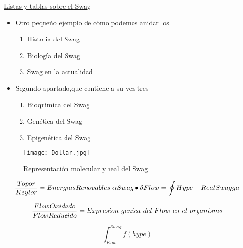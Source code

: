 \documentclass{article}
\begin{document}
\centerline{\Large\underline{Listas y tablas sobre el Swag}}

\bigskip

\renewcommand{\labelitemi}{\Large\color{red}\textbullet}
\addtolength{\leftmarginii}{3cm}
\begin{itemize}
 \item Otro pequeño ejemplo de cómo podemos anidar los 
 \begin{enumerate}
  \item Historia del Swag
  \item Biología del Swag
  \item Swag en la actualidad
 \end{enumerate}
 \item Segundo apartado,que contiene a su vez tres 
 \begin{enumerate}
  \item Bioquímica del Swag
  \item Genética del Swag
  \item Epigenética del Swag
 \end{enumerate}
\end{itemize}


\begin{figure}[h]
\texttt{[image: Dollar.jpg]}
\caption{Representación molecular y real del Swag}
\label{Suuuu}
\end{figure}

\newpage

\begin{equation}
\frac{Topor}{Keylor}=Energias Renovables \\ \
\alpha Swag \bullet \delta Flow = \oint Hype + RealSwagga
\end{equation}

\begin{equation}
\frac{Flow Oxidado}{Flow Reducido}= Expresion \\ \ genica \\ \ del \\ \ Flow \\ \ en \\ \ el \\ \ organismo
\end{equation}

\begin{equation}
\int_{Flow}^{Swag} f(hype)
\end{equation}
\end{document}
